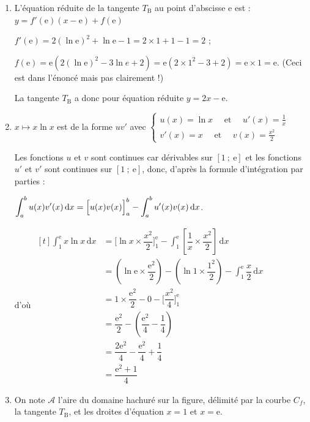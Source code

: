 \documentclass[10pt]{article}
\providecommand{\e}{{\mathrm{e}}}
\begin{document}
\begin{enumerate}
\item L'équation réduite de la tangente  $T_{\mathrm{B}}$ au point d'abscisse $\e$ est : $y= f'(\e)(x-\e )+ f(\e)$

$f'(\e)= 2(\ln \e)^{2} + \ln \e - 1 = 2 \times 1 + 1 - 1 = 2$ ;

$f(\e) = \e \left(2(\ln \e)^{2}-3 \ln e+2 \right)= \e \left(2 \times 1^2- 3 + 2\right)=  \e\times 1= \e$. (Ceci est dans l'énoncé mais pas clairement !)

La tangente $T_{\mathrm{B}}$ a donc pour équation réduite $y=2 x-\e$.

	\item $x \longmapsto x \ln x$ est de la forme $u v'$ avec $\begin{cases}u(x)=\ln x \quad\text { et }  \quad u'(x)=\frac{1}{x} \\ v'(x)=x \quad\text { et } \quad v(x)=\frac{x^2}{2}\end{cases}$

Les fonctions $u$ et $v$ sont continues car dérivables sur $\left[1~;~\e\right]$ et les fonctions $u'$ et $v'$ sont continues sur $\left[1~;~\e\right]$, donc, d'après la formule d'intégration par parties :

$\displaystyle \int_{a}^{b} u(x)v'(x)\, \mathrm{d}x = \Big [u(x)v(x)\strut\Big]_{a}^{b} - \int_{a}^{b} u'(x)v(x) \, \mathrm{d}x$.

d'où
$\begin{aligned}[t]
	\int_1^{\e}  x\ln x  \, \mathrm{d}x& =\Big[\ln x \times \dfrac{x^2}{2} \Big]_1^{\e}-\int_1^{\e} \left[\dfrac{1}{x} \times \dfrac{x^2}{2}\right] \, \mathrm{d}x\\
	& = \left( \ln \e \times \dfrac{\e^2}{2} \right) -\left(\ln 1 \times \dfrac{1^2}{2}\right) - \int_1^{\e} \dfrac{x}{2} \, \mathrm{d}x\\
	& = 1 \times \dfrac{\e^2}{2}- 0 - \Big[ \dfrac{x^2}{4} \Big]_1^{\e}\\
	& = \dfrac{\e^2}{2} - \left(\dfrac{\e^2}{4}-\dfrac{1}{4} \right)\\
	&= \dfrac{2\e^2}{4}- \dfrac{\e^2}{4}+\dfrac{1}{4} \\
	&= \dfrac{\e^{2}+1}{4}
\end{aligned}$




	\item On note $\mathcal{A}$ l'aire du domaine hachuré sur la figure, délimité par la courbe $C_{f}$, la tangente $T_{\mathrm{B}}$, et les droites d'équation $x=1$ et $x=\e$.


\end{enumerate}
\end{document}

